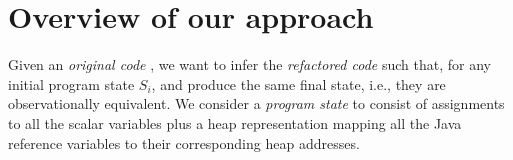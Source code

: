 \documentclass[runningheads,a4paper]{llncs}
\begin{document}

\section{Overview of our approach} \label{sec:approach}

Given an {\em original code} , we want to infer the 
{\em refactored code}  such that, for any initial program state
$S_i$,  and  produce the same final
state, i.e., they are observationally equivalent.
We consider a {\em program state} to consist of  
assignments to all the scalar variables plus a
heap representation mapping all the Java reference variables 
to their corresponding heap addresses.
%
%
\end{document}
